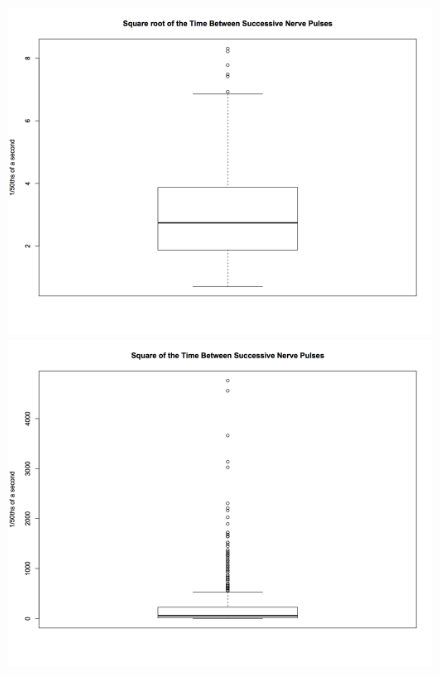 \documentclass[a4paper]{article}
\begin{document}
\begin{enumerate}
\begin{enumerate}
		\begin{figure}[!htb]
		    \centering
		    \begin{minipage}{0.5\textwidth}
		        \centering
		        \includegraphics[width=\linewidth, height=0.27\textheight]{sqrtdata.png}
		    \end{minipage}%
		    \begin{minipage}{0.5\textwidth}
		        \centering
		        \includegraphics[width=\linewidth, height=0.27\textheight]{squaredata.png}
		    \end{minipage}
		\end{figure}


\end{enumerate}
\end{enumerate}
\end{document}
